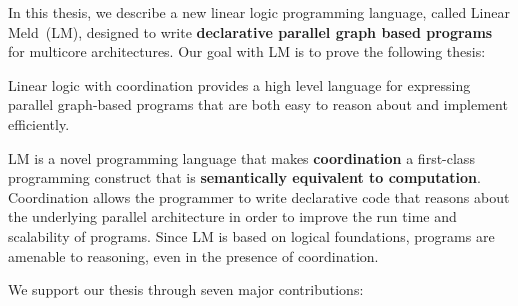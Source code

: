 
In this thesis, we describe a new linear logic programming language, called
Linear Meld~(LM), designed to write \textbf{declarative parallel graph based
programs} for multicore architectures. Our goal with LM is to prove the
following thesis:

\vspace{10px}
\begin{displayquote}
Linear logic with coordination provides a high level language for expressing
parallel graph-based programs that are both easy to reason about and implement
efficiently.
\end{displayquote}
\vspace{10px}

LM is a novel programming language that makes \textbf{coordination} a
first-class programming construct that is \textbf{semantically equivalent to
computation}. Coordination allows the programmer to write declarative code that
reasons about the underlying parallel architecture in order to improve the run
time and scalability of programs. Since LM is based on logical foundations,
programs are amenable to reasoning, even in the presence of coordination.

We support our thesis through seven major contributions:

